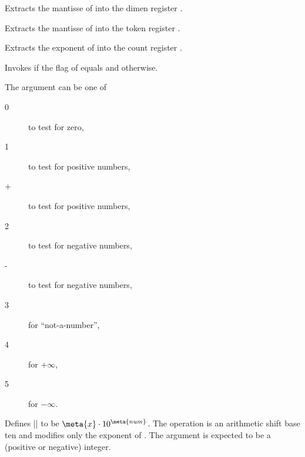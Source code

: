 \begin{command}{}
	Extracts the mantisse of  into the dimen register .
\end{command}
\begin{command}{}
	Extracts the mantisse of  into the token register .
\end{command}
\begin{command}{}
	Extracts the exponent of  into the count register .
\end{command}

\begin{command}{\pgfmathfloatifflags{}}
	Invokes  if the flag of  equals  and  otherwise.

	The argument  can be one of
	\begin{description}
		\item[0] to test for zero,
		\item[1] to test for positive numbers,
		\item[+] to test for positive numbers,
		\item[2] to test for negative numbers,
		\item[-] to test for negative numbers,
		\item[3] for ``not-a-number'',
		\item[4] for $+\infty$,
		\item[5] for $-\infty$.
	\end{description}
	
\begin{codeexample}[]

\end{codeexample}
\end{command}


\begin{command}{}
	Defines |\pgfmathresult| to be $\meta{x} \cdot 10^{\meta{num}}$. The operation is an arithmetic shift base ten and modifies only the exponent of . The argument  is expected to be a (positive or negative) integer.
\end{command}


